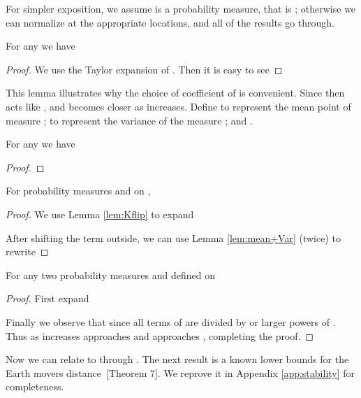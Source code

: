 \documentclass[11pt]{myclass}
\begin{document}
For simpler exposition, we assume  is a probability measure, that is ; otherwise we can normalize  at the appropriate locations, and all of the results go through.  

\begin{lemma}
For any  we have

\label{lem:Kflip}
\end{lemma}
\begin{proof}
We use the Taylor expansion of .
Then it is easy to see

\end{proof}

This lemma illustrates why the choice of coefficient of  is convenient.  Since then  acts like , and becomes closer as  increases.  
Define  to represent the mean point of measure ;
  to represent the variance of the measure ; and  
.

\begin{lemma}
For any  we have

\label{lem:mean+Var}
\end{lemma}
\begin{proof} 

\end{proof}


\begin{lemma} 
For probability measures  and  on ,  

\label{lem:decomp-kap}
\end{lemma}
\begin{proof}
We use Lemma \ref{lem:Kflip} to expand

After shifting the  term outside, we can use Lemma \ref{lem:mean+Var} (twice) to rewrite

\end{proof}


\begin{theorem}
For any two probability measures  and  defined on  
  
\label{thm:DK-means}
\end{theorem}
\begin{proof} 
First expand 

Finally we observe that since all terms of  are divided by  or larger powers of .  Thus as  increases  approaches  and  approaches , completing the proof.  
\end{proof}

Now we can relate  to  through .  
The next result is a known lower bounds for the Earth movers distance~\cite{Coh99}[Theorem 7].  We reprove it in Appendix \ref{app:stability} for completeness.
\end{document}
